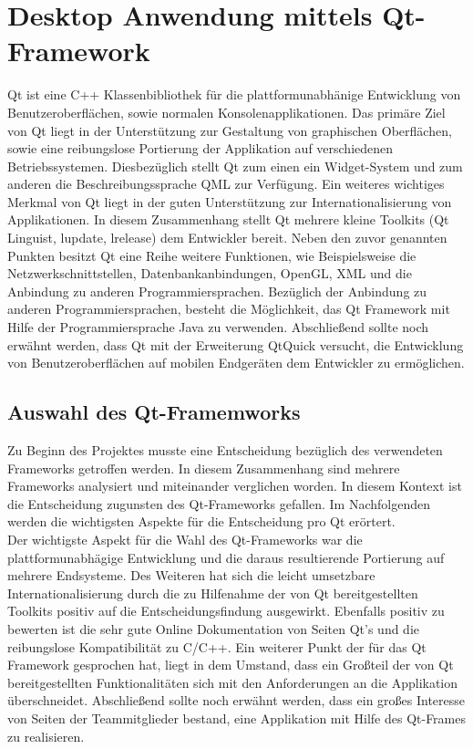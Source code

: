 \newpage
\section{Desktop Anwendung mittels Qt-Framework}

Qt ist eine C++ Klassenbibliothek für die plattformunabhänige Entwicklung von Benutzeroberflächen, sowie normalen Konsolenapplikationen. Das primäre Ziel von Qt liegt in der Unterstützung zur Gestaltung von graphischen Oberflächen, sowie eine reibungslose Portierung der Applikation auf verschiedenen Betriebssystemen. Diesbezüglich stellt Qt zum einen ein Widget-System und zum anderen die Beschreibungssprache QML zur Verfügung. Ein weiteres wichtiges Merkmal von Qt liegt in der guten Unterstützung zur Internationalisierung von Applikationen. In diesem Zusammenhang stellt Qt mehrere kleine Toolkits (Qt Linguist, lupdate, lrelease) dem Entwickler bereit. Neben den zuvor genannten Punkten besitzt Qt eine Reihe weitere Funktionen, wie Beispielsweise die Netzwerkschnittstellen, Datenbankanbindungen, OpenGL, XML und die Anbindung zu anderen Programmiersprachen. Bezüglich der Anbindung zu anderen Programmiersprachen, besteht die Möglichkeit, das Qt Framework mit Hilfe der Programmiersprache Java zu verwenden. Abschließend sollte noch erwähnt werden, dass Qt mit der Erweiterung QtQuick versucht, die Entwicklung von Benutzeroberflächen auf mobilen Endgeräten dem Entwickler zu ermöglichen.

\cite{vorteileQt1} \cite{vorteileQt2} \cite{vorteileQt3}

\subsection{Auswahl des Qt-Framemworks}

Zu Beginn des Projektes musste eine Entscheidung bezüglich des verwendeten Frameworks getroffen werden. In diesem Zusammenhang sind mehrere Frameworks analysiert und miteinander verglichen worden. In diesem Kontext ist die Entscheidung zugunsten des Qt-Frameworks gefallen. Im Nachfolgenden werden die wichtigsten Aspekte für die Entscheidung pro Qt erörtert. \\

Der wichtigste Aspekt für die Wahl des Qt-Frameworks war die plattformunabhägige Entwicklung und die daraus resultierende Portierung auf mehrere Endsysteme. Des Weiteren hat sich die leicht umsetzbare Internationalisierung durch die zu Hilfenahme der von Qt bereitgestellten Toolkits positiv auf die Entscheidungsfindung ausgewirkt. Ebenfalls positiv zu bewerten ist die sehr gute Online Dokumentation von Seiten Qt’s und die reibungslose Kompatibilität zu C/C++. Ein weiterer Punkt der für das Qt Framework gesprochen hat, liegt in dem Umstand, dass ein Großteil der von Qt bereitgestellten Funktionalitäten sich mit den Anforderungen an die Applikation überschneidet. Abschließend sollte noch erwähnt werden, dass ein großes Interesse von Seiten der Teammitglieder bestand, eine Applikation mit Hilfe des Qt-Frames zu realisieren.


